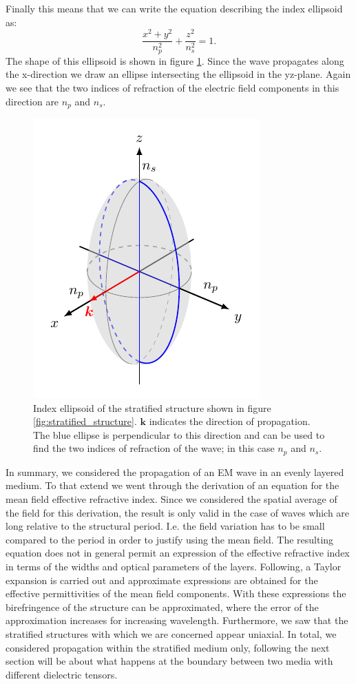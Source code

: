 Finally this means that we can write the equation describing the index ellipsoid as:
\begin{equation}
    \frac{x^2+y^2}{n_p^2}+\frac{z^2}{n_s^2}=1.
\end{equation}
The shape of this ellipsoid is shown in figure \ref{fig:index_ellipse}. Since the wave propagates along the x-direction we draw an ellipse intersecting the ellipsoid in the yz-plane. Again we see that the two indices of refraction of the electric field components in this direction are $n_{p}$ and $n_{s}$. 
\begin{figure}[h]
    \centering
    \includegraphics[scale=1]{images/theory/tikz_index_ellipse.pdf}
    \caption{Index ellipsoid of the stratified structure shown in figure \ref{fig:stratified_structure}. $\bm{k}$ indicates the direction of propagation. The blue ellipse is perpendicular to this direction and can be used to find the two indices of refraction of the wave; in this case $n_{p}$ and $n_{s}$.}
    \label{fig:index_ellipse}
\end{figure}

In summary, we considered the propagation of an EM wave in an evenly layered medium. To that extend we went through the derivation of an equation for the mean field effective refractive index. Since we considered the spatial average of the field for this derivation, the result is only valid in the case of waves which are long relative to the structural period. I.e. the field variation has to be small compared to the period in order to justify using the mean field. The resulting equation does not in general permit an expression of the effective refractive index in terms of the widths and optical parameters of the layers. Following, a Taylor expansion is carried out and approximate expressions are obtained for the effective permittivities of the mean field components. With these expressions the birefringence of the structure can be approximated, where the error of the approximation increases for increasing wavelength. Furthermore, we saw that the stratified structures with which we are concerned appear uniaxial. In total, we considered propagation within the stratified medium only, following the next section will be about what happens at the boundary between two media with different dielectric tensors.

